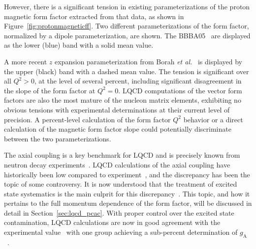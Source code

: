 \documentclass{ar-1col}
\begin{document}
However, there is a significant tension in existing parameterizations of the proton magnetic form factor extracted from that data, as
shown in Figure~\ref{fig:protonmagneticff}.
Two different parameterizations of the form factor, normalized by a dipole parameterization, are shown.
The BBBA05~\cite{Bradford:2006yz} are displayed as the lower (blue) band with a solid mean value.%
\begin{marginnote}
\end{marginnote}%
A more recent $z$ expansion parameterization from Borah {\it et al.}~\cite{Borah:2020gte} is displayed by the upper (black) band with a dashed mean value.
The tension is significant over all $Q^2 > 0$, at the level of several percent,
including significant disagreement in the slope of the form factor at $Q^2 = 0$.
LQCD computations of the vector form factors are also the most mature of the nucleon matrix elements,
exhibiting no obvious tensions with experimental determinations
at their current level of precision.
A percent-level calculation of the form factor $Q^2$ behavior or a direct calculation of the magnetic form factor slope could potentially discriminate
between the two parameterizations.

The axial coupling
is a key benchmark for LQCD and is precisely known
from neutron decay experiments~\cite{Dubbers:2021wqv}.
LQCD calculations of the axial coupling have historically been low compared to experiment~\cite{Aoki:2021kgd},
 and the discrepancy has been the topic of some controversy.
It is now understood that the treatment of excited state systematics is the main culprit for this discrepancy~\cite{Bar:2017kxh,Ottnad:2020qbw,Aoki:2021kgd}.
This topic, and how it pertains to the full momentum dependence of the form factor,
 will be discussed in detail in Section~\ref{sec:lqcd_pcac}.
With proper control over the excited state contamination, LQCD calculations are now in good agreement with the experimental value~\cite{Jang:2019vkm,Gupta:2018qil,Alexandrou:2020okk,Abramczyk:2019fnf,Park:2021ypf,RQCD:2019jai,Hasan:2019noy,Djukanovic:2021yqg,Harris:2019bih,Liang:2018pis,Shintani:2018ozy,Ishikawa:2018rew}
 with one group achieving a sub-percent determination of $g_{\mathrm{A}}$~\cite{Chang:2018uxx,Berkowitz:2018gqe,Walker-Loud:2019cif}.
\end{document}
